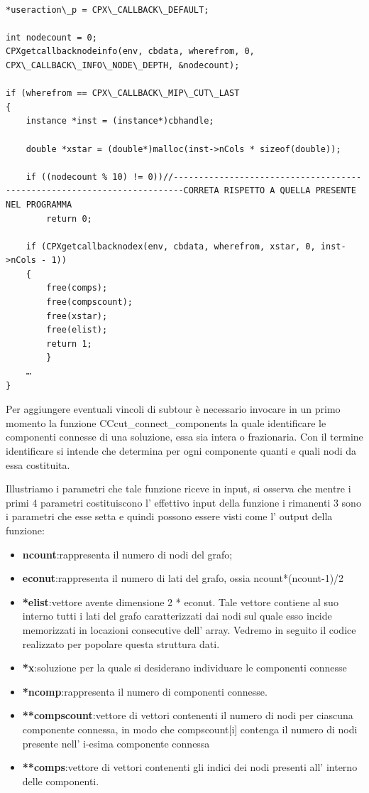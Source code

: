 \documentclass[11pt]{article}
\begin{document}
\begin{lstlisting}

*useraction\_p = CPX\_CALLBACK\_DEFAULT;
	
int nodecount = 0;
CPXgetcallbacknodeinfo(env, cbdata, wherefrom, 0, CPX\_CALLBACK\_INFO\_NODE\_DEPTH, &nodecount);
	
if (wherefrom == CPX\_CALLBACK\_MIP\_CUT\_LAST 
{
	instance *inst = (instance*)cbhandle;
		
	double *xstar = (double*)malloc(inst->nCols * sizeof(double));

 	if ((nodecount % 10) != 0))//------------------------------------------------------------------------CORRETA RISPETTO A QUELLA PRESENTE NEL PROGRAMMA
		return 0;

	if (CPXgetcallbacknodex(env, cbdata, wherefrom, xstar, 0, inst->nCols - 1))
	{
		free(comps);
		free(compscount);
		free(xstar);
		free(elist);
		return 1; 
		}
	…
}

\end{lstlisting}


Per aggiungere eventuali vincoli di subtour è necessario invocare in un primo momento la funzione CCcut\_connect\_components la quale identificare le componenti connesse di una soluzione, essa sia intera o frazionaria. Con il termine identificare si intende che determina per ogni componente quanti e quali nodi da essa costituita.

Illustriamo i parametri che tale funzione riceve in input, si osserva che mentre i primi 4 parametri costituiscono l' effettivo input della funzione i rimanenti 3 sono i parametri che esse setta e quindi possono essere visti come l' output della funzione:

\begin{itemize}
	\item \textbf{ncount}:rappresenta il numero di nodi del grafo;
	\item \textbf{econut}:rappresenta il numero di lati del grafo, ossia ncount*(ncount-1)/2
	\item \textbf{*elist}:vettore avente dimensione 2 * econut. Tale vettore contiene al suo interno tutti i lati del grafo caratterizzati dai nodi sul quale esso incide memorizzati in locazioni consecutive dell’ array. Vedremo in seguito il codice realizzato per popolare questa struttura dati.
	\item \textbf{*x}:soluzione per la quale si desiderano individuare le componenti connesse
	\item \textbf{*ncomp}:rappresenta il numero di componenti connesse.
	\item \textbf{**compscount}:vettore di vettori contenenti il numero di nodi per ciascuna componente connessa, in modo che compscount[i] contenga il numero di nodi presente nell’ i-esima componente connessa
	\item \textbf{**comps}:vettore di vettori contenenti gli indici dei nodi presenti all' interno delle componenti.
\end{itemize}
\end{document}
